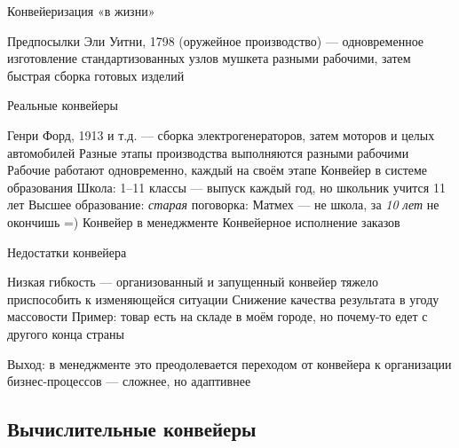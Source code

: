 \documentclass[xetex,aspectratio=43]{beamer}
\begin{document}
\begin{frame}{Конвейеризация «в жизни»}
\begin{block}{Предпосылки}
    Эли Уитни, 1798 (оружейное производство) — одновременное изготовление стандартизованных узлов мушкета разными рабочими, затем быстрая сборка готовых изделий
\end{block}

\begin{block}{Реальные конвейеры}
    \begin{outline}[itemize]
        \1 Генри Форд, 1913 и т.д. — сборка электрогенераторов, затем моторов и целых автомобилей
            \2 Разные этапы производства выполняются разными рабочими
            \2 Рабочие работают одновременно, каждый на своём этапе
        \1 Конвейер в системе образования
            \2 Школа: 1–11 классы — выпуск каждый год, но школьник учится 11 лет
            \2 Высшее образование: \emph{старая} поговорка: Матмех — не школа, за \emph{10 лет} не окончишь =)
        \1 Конвейер в менеджменте
            \2 Конвейерное исполнение заказов
    \end{outline}
\end{block}
\end{frame}

\begin{frame}{Недостатки конвейера}
    \begin{outline}[itemize]
        \1 Низкая гибкость — организованный и запущенный конвейер тяжело приспособить к изменяющейся ситуации
        \1 Снижение качества результата в угоду массовости
            \2 Пример: товар есть на складе в моём городе, но почему-то едет с другого конца страны
    \end{outline}
    \pause
    Выход: в менеджменте это преодолевается переходом от конвейера к организации бизнес-процессов — сложнее, но адаптивнее
\end{frame}

\subsection{Вычислительные конвейеры}
\end{document}
